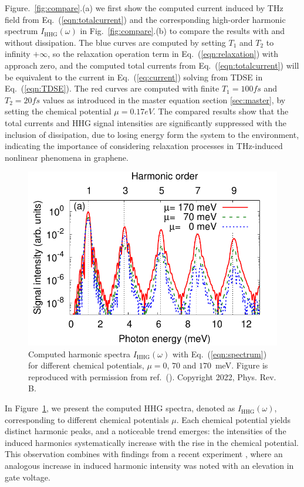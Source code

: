 \color{red}
Figure.~\ref{fig:compare}.(a) we first show the computed current induced by THz field from Eq.~(\ref{eqn:totalcurrent}) and the corresponding high-order harmonic spectrum $I_{\mathrm{HHG}}(\omega)$ in Fig.~\ref{fig:compare}.(b) to compare the results with and without dissipation. The blue curves are computed by setting $T_1$ and $T_2$ to infinity $+\infty$, so the relaxation operation term in Eq.~(\ref{eqn:relaxation}) with approach zero, and the computed total currents from Eq.~(\ref{eqn:totalcurrent}) will be equivalent to the current in Eq.~(\ref{eq:current}) solving from \gls{TDSE} in Eq.~(\ref{eqn:TDSE}). The red curves are computed with finite $T_1=100 fs$ and $T_2=20 fs$ values as introduced in the master equation section \ref{sec:master}, by setting the chemical potential $\mu = 0.17 eV$. The compared results show that the total currents and \gls{HHG} signal intensities are significantly suppressed  with the inclusion of dissipation, due to losing energy form the system to the environment, indicating the importance of considering relaxation processes in THz-induced nonlinear phenomena in graphene.
\color{black}
\begin{figure}[htbp]
	\centering
	\includegraphics[width=0.8\linewidth]{pic/hhg_mu.pdf}
	\caption{\label{fig:hhg_mu}
		Computed harmonic spectra $I_{\mathrm{HHG}}(\omega)$ with Eq.~(\ref{eqn:spectrum}) for different
		chemical potentials, $\mu = 0$, $70$ and $170$~meV. Figure is reproduced with permission from ref.~(\cite{PhysRevB.106.024313}). Copyright 2022, Phys. Rev. B.}
\end{figure}

In Figure~\ref{fig:hhg_mu}, we present the computed HHG spectra, denoted as $I_{\mathrm{HHG}}(\omega)$, corresponding to different chemical potentials $\mu$. Each chemical potential yields distinct harmonic peaks, and a noticeable trend emerges: the intensities of the induced harmonics systematically increase with the rise in the chemical potential. This observation combines with findings from a recent experiment \cite{kovalev2021electrical}, where an analogous increase in induced harmonic intensity was noted with an elevation in gate voltage.

